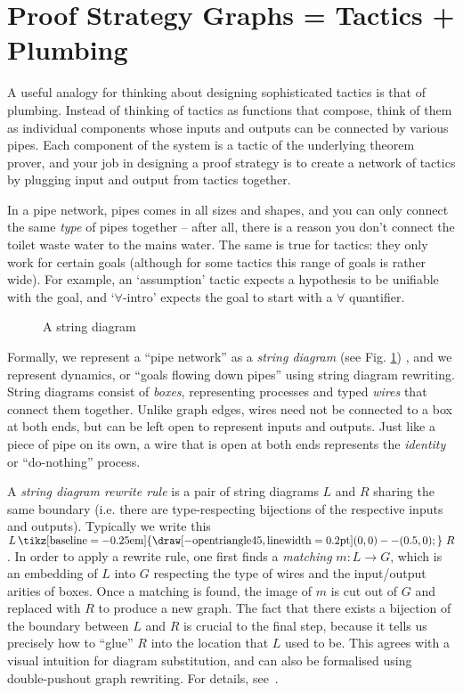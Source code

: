 \documentclass{llncs}
\newcommand{\cmdrewritesto}{\tikz[baseline=-0.25em] { \draw [-open triangle 45, line width=0.2pt] (0,0) -- (0.5,0); }\,}
\DeclareMathOperator{\rewritesto}{\cmdrewritesto}
\begin{document}
\beforesection
\section{Proof Strategy Graphs = Tactics + Plumbing}\label{sec:psgraph}
\aftersection

A useful analogy for thinking about designing sophisticated tactics is that of plumbing. Instead of thinking of tactics as functions that compose, think of them as individual components whose inputs and outputs can be connected by various pipes. Each component of the system is a tactic of the underlying theorem prover, and your job in designing a proof strategy is to create a network of tactics by plugging input and output from tactics together.

In a pipe network, pipes comes in all sizes and shapes, and you can only connect the same \emph{type} of pipes together -- after all, there is a reason you don't connect the toilet waste water to the mains water. The same is true for tactics: they only work for certain goals (although for some tactics this range of goals is rather wide). For example, an `assumption' tactic expects a hypothesis to be unifiable with the goal, and `$\forall$-intro' expects the goal to start with a $\forall$ quantifier. 

\begin{figure}\centering
  \vspace{-12pt}
  \caption{A string diagram}\label{fig:string-diagram}
  \vspace{-14pt}
\end{figure}

Formally, we represent a ``pipe network'' as a \textit{string diagram} (see Fig. \ref{fig:string-diagram}) \cite{paper:Dixon:10}, and we represent dynamics, or ``goals flowing down pipes'' using string diagram rewriting. String diagrams consist of \textit{boxes}, representing processes and typed \textit{wires} that connect them together. Unlike graph edges, wires need not be connected to a box at both ends, but can be left open to represent inputs and outputs. Just like a piece of pipe on its own, a wire that is open at both ends represents the \textit{identity} or ``do-nothing'' process.

A \textit{string diagram rewrite rule} is a pair of string diagrams $L$ and $R$ sharing the same boundary (i.e. there are type-respecting bijections of the respective inputs and outputs). Typically we write this $L \rewritesto R$. In order to apply a rewrite rule, one first finds a \textit{matching} $m : L \to G$, which is an embedding of $L$ into $G$ respecting the type of wires and the input/output arities of boxes. Once a matching is found, the image of $m$ is cut out of $G$ and replaced with $R$ to produce a new graph. The fact that there exists a bijection of the boundary between $L$ and $R$ is crucial to the final step, because it tells us precisely how to ``glue'' $R$ into the location that $L$ used to be. This agrees with a visual intuition for diagram substitution, and can also be formalised using double-pushout graph rewriting. For details, see~\cite{paper:Dixon:10}.
\end{document}
